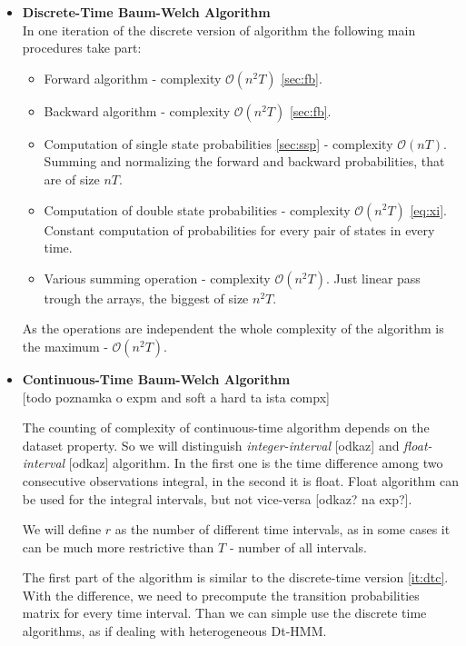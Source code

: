 \documentclass[thesis=M,english]{FITthesis}[2012/10/20]
\begin{document}
\begin{itemize}\label{it:dtc}
\item \textbf{ Discrete-Time Baum-Welch Algorithm } \\
In one iteration of the discrete version of algorithm the following main procedures take part:
\begin{itemize}
\item Forward algorithm - complexity $\mathcal{O}(n^2T)$ \ref{sec:fb}.
\item Backward algorithm - complexity $\mathcal{O}(n^2T)$ \ref{sec:fb}.
\item Computation of single state probabilities \ref{sec:ssp} - complexity $\mathcal{O}(nT)$. Summing and normalizing the forward and backward probabilities, that are of size $nT$.
\item Computation of double state probabilities - complexity $\mathcal{O}(n^2T)$ \eqref{eq:xi}. Constant computation of probabilities for every pair of states in every time.
\item Various summing operation - complexity $\mathcal{O}(n^2T)$. Just linear pass trough the arrays, the biggest of size $n^2T$.
\end{itemize}

As the operations are independent the whole complexity of the algorithm is the maximum -  $\mathcal{O}(n^2T)$.

\item \textbf{ Continuous-Time Baum-Welch Algorithm } \\

[todo poznamka o expm and soft a hard ta ista compx]

The counting of complexity of continuous-time algorithm depends on the dataset property. So we will distinguish \textit{integer-interval} [odkaz] and \textit{float-interval} [odkaz] algorithm. In the first one is the time difference among two consecutive observations integral, in the second it is float. Float algorithm can be used for the integral intervals, but not vice-versa [odkaz? na exp?].

We will define $r$ as the number of different time intervals, as in some cases it can be much more restrictive than $T$ - number of all intervals.

The first part of the algorithm is similar to the discrete-time version \ref{it:dtc}. With the difference, we need to precompute the transition probabilities matrix for every time interval. Than we can simple use the discrete time algorithms, as if dealing with heterogeneous Dt-HMM. 


\end{itemize}
\end{document}
